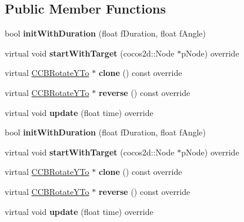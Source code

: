 \subsection*{Public Member Functions}
\begin{DoxyCompactItemize}
\item 
\mbox{\label{classcocosbuilder_1_1CCBRotateYTo_a63860c4e942ba7bd39944a1809fc05ad}} 
bool {\bfseries init\+With\+Duration} (float f\+Duration, float f\+Angle)
\item 
\mbox{\label{classcocosbuilder_1_1CCBRotateYTo_a534d37c6981b49d760586216f086fa0d}} 
virtual void {\bfseries start\+With\+Target} (cocos2d\+::\+Node $\ast$p\+Node) override
\item 
\mbox{\label{classcocosbuilder_1_1CCBRotateYTo_a0732941d3227bbf03cdef49ae0aa90ac}} 
virtual \hyperlink{classcocosbuilder_1_1CCBRotateYTo}{C\+C\+B\+Rotate\+Y\+To} $\ast$ {\bfseries clone} () const override
\item 
\mbox{\label{classcocosbuilder_1_1CCBRotateYTo_af9d246a3fdda213f743f49b7b02d875c}} 
virtual \hyperlink{classcocosbuilder_1_1CCBRotateYTo}{C\+C\+B\+Rotate\+Y\+To} $\ast$ {\bfseries reverse} () const override
\item 
\mbox{\label{classcocosbuilder_1_1CCBRotateYTo_abf208da13a6f412154e6cdbb0cf05e6c}} 
virtual void {\bfseries update} (float time) override
\item 
\mbox{\label{classcocosbuilder_1_1CCBRotateYTo_a63860c4e942ba7bd39944a1809fc05ad}} 
bool {\bfseries init\+With\+Duration} (float f\+Duration, float f\+Angle)
\item 
\mbox{\label{classcocosbuilder_1_1CCBRotateYTo_a4faf755635a3c4a43104dff67b966ee8}} 
virtual void {\bfseries start\+With\+Target} (cocos2d\+::\+Node $\ast$p\+Node) override
\item 
\mbox{\label{classcocosbuilder_1_1CCBRotateYTo_a8e3ab775efe0989b94cd03555ab54240}} 
virtual \hyperlink{classcocosbuilder_1_1CCBRotateYTo}{C\+C\+B\+Rotate\+Y\+To} $\ast$ {\bfseries clone} () const override
\item 
\mbox{\label{classcocosbuilder_1_1CCBRotateYTo_acfd8355119b479ef68750731e73018e5}} 
virtual \hyperlink{classcocosbuilder_1_1CCBRotateYTo}{C\+C\+B\+Rotate\+Y\+To} $\ast$ {\bfseries reverse} () const override
\item 
\mbox{\label{classcocosbuilder_1_1CCBRotateYTo_aa24d9fcb43de65edc948971cb261b94f}} 
virtual void {\bfseries update} (float time) override
\end{DoxyCompactItemize}
